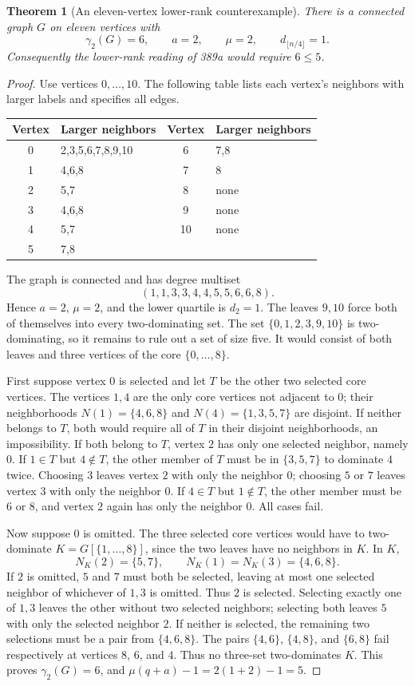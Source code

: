 \documentclass[11pt,a4paper]{article}
\newtheorem{theorem}{Theorem}[section]
\theoremstyle{definition}\newtheorem{definition}[theorem]{Definition}
\theoremstyle{remark}\newtheorem{remark}[theorem]{Remark}
\begin{document}
\begin{theorem}[An eleven-vertex lower-rank counterexample]
\label{r12:389a:counter}
There is a connected graph $G$ on eleven vertices with
\[
 \gamma_2(G)=6,\qquad a=2,\qquad \mu=2,\qquad
 d_{\lfloor n/4\rfloor}=1.
\]
Consequently the lower-rank reading of 389a would require $6\le5$.
\end{theorem}
\begin{proof}
Use vertices $0,\ldots,10$. The following table lists each vertex's
neighbors with larger labels and specifies all edges.
\begin{center}
\begin{tabular}{cl@{\qquad}cl}
\toprule
Vertex&Larger neighbors&Vertex&Larger neighbors\\\midrule
0&2,3,5,6,7,8,9,10&6&7,8\\
1&4,6,8&7&8\\
2&5,7&8&none\\
3&4,6,8&9&none\\
4&5,7&10&none\\
5&7,8&&\\\bottomrule
\end{tabular}
\end{center}
The graph is connected and has degree multiset
\[
 (1,1,3,3,4,4,5,5,6,6,8).
\]
Hence $a=2$, $\mu=2$, and the lower quartile is $d_2=1$.
The leaves $9,10$ force both of themselves into every two-dominating
set. The set $\{0,1,2,3,9,10\}$ is two-dominating, so it remains
to rule out a set of size five. It would consist of both leaves
and three vertices of the core $\{0,\ldots,8\}$.

First suppose vertex $0$ is selected and let $T$ be the other two
selected core vertices. The vertices $1,4$ are the only core vertices
not adjacent to $0$; their neighborhoods
$N(1)=\{4,6,8\}$ and $N(4)=\{1,3,5,7\}$ are disjoint.
If neither belongs to $T$, both would require all of $T$ in their
disjoint neighborhoods, an impossibility. If both belong to $T$,
vertex $2$ has only one selected neighbor, namely $0$.
If $1\in T$ but $4\notin T$, the other member of $T$ must be in
$\{3,5,7\}$ to dominate $4$ twice. Choosing $3$ leaves vertex $2$
with only the neighbor $0$; choosing $5$ or $7$ leaves vertex $3$
with only the neighbor $0$. If $4\in T$ but $1\notin T$, the other
member must be $6$ or $8$, and vertex $2$ again has only the neighbor
$0$. All cases fail.

Now suppose $0$ is omitted. The three selected core vertices would
have to two-dominate $K=G[\{1,\ldots,8\}]$, since the two leaves
have no neighbors in $K$. In $K$,
\[
 N_K(2)=\{5,7\},\qquad N_K(1)=N_K(3)=\{4,6,8\}.
\]
If $2$ is omitted, $5$ and $7$ must both be selected, leaving at
most one selected neighbor of whichever of $1,3$ is omitted.
Thus $2$ is selected. Selecting exactly one of $1,3$ leaves the
other without two selected neighbors; selecting both leaves $5$
with only the selected neighbor $2$. If neither is selected, the
remaining two selections must be a pair from $\{4,6,8\}$.
The pairs $\{4,6\}$, $\{4,8\}$, and $\{6,8\}$ fail respectively
at vertices $8$, $6$, and $4$. Thus no three-set two-dominates $K$.
This proves $\gamma_2(G)=6$, and
$\mu(q+a)-1=2(1+2)-1=5$.
\end{proof}
\end{document}

